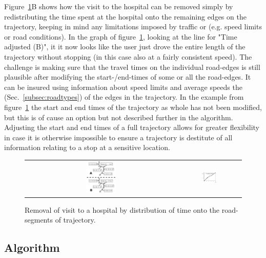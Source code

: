 Figure~\ref{fig:adjustTrajec}B shows how the visit to the hospital can be removed simply by redistributing the time spent at the hospital onto the remaining edges on the trajectory, keeping in mind any limitations imposed by traffic or \rt (e.g. speed limits or road conditions). In the graph of figure~\ref{fig:adjustTrajec}, looking at the line for "Time adjusted (B)", it it now looks like the user just drove the entire length of the trajectory without stopping (in this case also at a fairly consistent speed).
The challenge is making sure that the travel times on the individual road-edges is still plausible after modifying the start-/end-times of some or all the road-edges. It can be insured using information about speed limits and average speeds the \rt (Sec.~\ref{subsec:roadtypes}) of the edges in the trajectory. In the example from figure~\ref{fig:adjustTrajec} the start and end times of the trajectory as whole has not been modified, but this is of cause an option but not described further in the algorithm. Adjusting the start and end times of a full trajectory allows for greater flexibility in case it is otherwise impossible to ensure a trajectory is destitute of all information relating to a stop at a sensitive location.


\begin{figure}	
       \center
       \begin{tabular}{cc}
		\includegraphics[width=0.20\textwidth]{figures/trajecAdjustTime.pdf} &
		\includegraphics[width=0.25\textwidth]{figures/trajecAdjustTimeGraph.pdf} \\
	\end{tabular}
       \caption{Removal of visit to a hospital by distribution of time onto the road-segments of trajectory.}
  \label{fig:adjustTrajec}
\end{figure}



\subsection{Algorithm}

